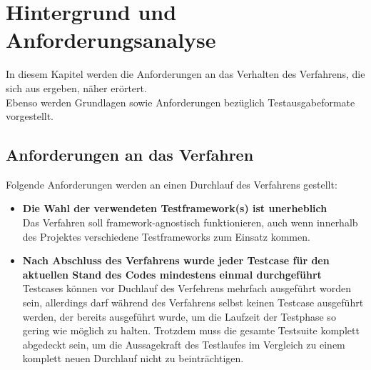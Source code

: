\chapter{Hintergrund und Anforderungsanalyse}\label{chap:Hintergrund}
In diesem Kapitel werden die Anforderungen an das Verhalten des Verfahrens, die sich aus  ergeben, näher erörtert.\\
Ebenso werden Grundlagen sowie Anforderungen bezüglich Testausgabeformate vorgestellt. 
% 
% 
\section{Anforderungen an das Verfahren}\label{Anforderungen Tool}
Folgende Anforderungen werden an einen Durchlauf des Verfahrens gestellt:
\begin{itemize}
    \item \textbf{Die Wahl der verwendeten Testframework(s) ist unerheblich}\\
    Das Verfahren soll framework-agnostisch funktionieren, auch wenn innerhalb des Projektes verschiedene Testframeworks zum Einsatz kommen.
    \item \textbf{Nach Abschluss des Verfahrens wurde jeder Testcase für den aktuellen Stand des Codes mindestens einmal durchgeführt}\\
    Testcases können vor Duchlauf des Verfehrens mehrfach ausgeführt worden sein, allerdings darf während des Verfahrens selbst keinen Testcase ausgeführt werden, der bereits ausgeführt wurde, um die Laufzeit der Testphase so gering wie möglich zu halten. Trotzdem muss die gesamte Testsuite komplett abgedeckt sein, um die Aussagekraft des Testlaufes im Vergleich zu einem komplett neuen Durchlauf nicht zu beinträchtigen.
\end{itemize}

